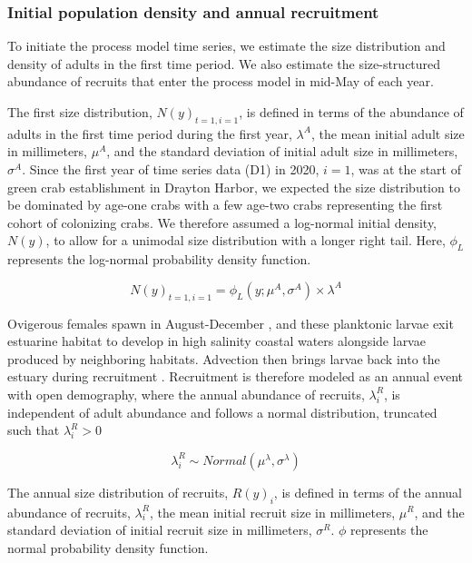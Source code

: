 \documentclass{article}
\begin{document}
\subsubsection*{Initial population density and annual recruitment}

To initiate the process model time series, we estimate the size distribution and density of adults in the first time period. We also estimate the size-structured abundance of recruits that enter the process model in mid-May of each year. 

The first size distribution, $N(y)_{t=1, i=1}$, is defined in terms of the abundance of adults in the first time period during the first year, $\lambda^{A}$, the mean initial adult size in millimeters, $\mu^A$, and the standard deviation of initial adult size in millimeters, $\sigma^A$. Since the first year of time series data (D1) in 2020, $i = 1$, was at the start of green crab establishment in Drayton Harbor, we expected the size distribution to be dominated by age-one crabs with a few age-two crabs representing the first cohort of colonizing crabs. We therefore assumed a log-normal initial density, $N(y)$, to allow for a unimodal size distribution with a longer right tail. Here, $\phi_L$ represents the log-normal probability density function.

\begin{equation}
N(y)_{t=1, i=1} = \phi_L(y; \mu^A, \sigma^A) \times \lambda^A
\end{equation}

Ovigerous females spawn in August-December \parencite{klassen2007biological}, and these planktonic larvae exit estuarine habitat to develop in high salinity coastal waters alongside larvae produced by neighboring habitats. Advection then brings larvae back into the estuary during recruitment \parencite{young2019life}. Recruitment is therefore modeled as an annual event with open demography, where the annual abundance of recruits, $\lambda^R_i$, is independent of adult abundance and follows a normal distribution, truncated such that $\lambda^R_i > 0$  

\begin{equation}
\lambda^R_i \sim Normal(\mu^{\lambda}, \sigma^{\lambda})
\end{equation}

The annual size distribution of recruits, $R(y)_{i}$, is defined in terms of the annual abundance of recruits, $\lambda^R_i$, the mean initial recruit size in millimeters, $\mu^R$, and the standard deviation of initial recruit size in millimeters, $\sigma^R$. $\phi$ represents the normal probability density function.
\end{document}
